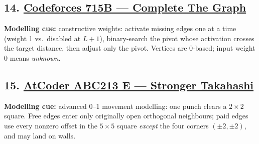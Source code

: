\documentclass[12pt]{article}
\begin{document}
\subsection*{14. \href{https://codeforces.com/problemset/problem/715/B}{Codeforces 715B --- Complete The Graph}}
\textbf{Modelling cue:} constructive weights: activate missing edges one at a time (weight 1 vs.\ disabled at $L+1$), binary-search the pivot whose activation crosses the target distance, then adjust only the pivot. Vertices are 0-based; input weight 0 means \emph{unknown}.

\subsection*{15. \href{https://atcoder.jp/contests/abc213/tasks/abc213_e}{AtCoder ABC213 E --- Stronger Takahashi}}
\textbf{Modelling cue:} advanced 0--1 movement modelling: one punch clears a $2\times2$ square. Free edges enter only originally open orthogonal neighbours; paid edges use every nonzero offset in the $5\times5$ square \emph{except} the four corners $(\pm2,\pm2)$, and may land on walls.
\end{document}
